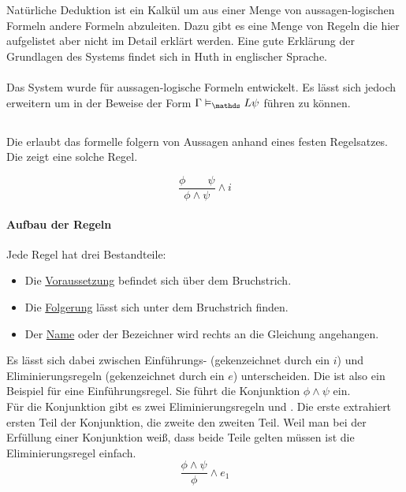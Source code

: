 
\section{\ND} %
\label{sub:natuerliche_folgerung}
Natürliche Deduktion ist ein Kalkül um aus einer Menge von aussagen-logischen Formeln andere Formeln abzuleiten.
Dazu gibt es eine Menge von Regeln die hier aufgelistet aber nicht im Detail erklärt werden.
Eine gute Erklärung der Grundlagen des Systems findet sich in Huth \cite[Kapitel 1.2 (natural deduction)]{huth2004logic} in englischer Sprache.\\
\\
Das System wurde für aussagen-logische Formeln entwickelt. Es lässt sich jedoch erweitern um in der \ML Beweise der Form $\Gamma \vDash_\Menge{L} \psi$ führen zu können.\\

\subsection{\ND \AL} %
\label{par:natuerliche_deduktion_aussagenlogick}
Die \ND erlaubt das formelle folgern von Aussagen anhand eines festen Regelsatzes.
Die  zeigt eine solche Regel.

\begin{equation}
	\label{eq:iConjunction}
	\frac{\phi \qquad \psi}{\phi \wedge \psi} \wedge i
\end{equation}	

\paragraph{Aufbau der Regeln}

Jede Regel hat drei Bestandteile:
\begin{itemize}
	\item Die \underline{Voraussetzung} befindet sich über dem Bruchstrich.
	\item Die \underline{Folgerung} lässt sich unter dem Bruchstrich finden.
	\item Der \underline{Name} oder der Bezeichner wird rechts an die Gleichung angehangen.
\end{itemize}
Es lässt sich dabei zwischen Einführungs- (gekenzeichnet durch ein $i$) und Eliminierungsregeln (gekenzeichnet durch ein $e$) unterscheiden.
Die  ist also ein Beispiel für eine Einführungsregel.
Sie führt die Konjunktion $\phi \wedge \psi$ ein.\\
Für die Konjunktion gibt es zwei Eliminierungsregeln  und .
Die erste extrahiert ersten Teil der Konjunktion, die zweite den zweiten Teil.
Weil man bei der Erfüllung einer Konjunktion weiß, dass beide Teile gelten müssen ist die Eliminierungsregel einfach.\\
%
\begin{equation}
	\label{eq:e1Conjunction}
	\frac{\phi \wedge \psi}{\phi} \wedge e_1
\end{equation}

